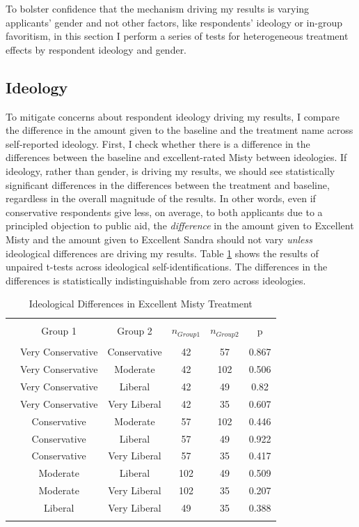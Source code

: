 \documentclass[12pt]{article}%
\begin{document}
\begin{doublespace}
To bolster confidence that the mechanism driving my results is varying applicants' gender and not other factors, like respondents' ideology or in-group favoritism, in this section I perform a series of tests for heterogeneous treatment effects by respondent ideology and gender.

\subsection*{Ideology}
To mitigate concerns about respondent ideology driving my results, I compare the difference in the amount given to the baseline and the treatment name across self-reported ideology. First, I check whether there is a difference in the differences between the baseline and excellent-rated Misty between ideologies. If ideology, rather than gender, is driving my results, we should see statistically significant differences in the differences between the treatment and baseline, regardless in the overall magnitude of the results. In other words, even if conservative respondents give less, on average, to both applicants due to a principled objection to public aid, the \textit{difference} in the amount given to Excellent Misty and the amount given to Excellent Sandra should not vary \textit{unless} ideological differences are driving my results. Table \ref{ideo-mist} shows the results of unpaired t-tests across ideological self-identifications. The differences in the differences is statistically indistinguishable from zero across ideologies.

\begin{table}[!htbp] \centering 
	\caption{Ideological Differences in Excellent Misty Treatment} 
	\label{ideo-mist} 
	\begin{tabular}{@{\extracolsep{5pt}} cccccc} 
		\\[-1.8ex]\hline 
		\hline \\[-1.8ex] 
		& Group 1 & Group 2 & $n_{Group 1}$ & $n_{Group 2}$ & p \\ 
		\hline \\[-1.8ex] 
		& Very Conservative & Conservative & 42 & 57 & 0.867 \\ 
		 & Very Conservative & Moderate & 42 & 102 & 0.506 \\ 
		 & Very Conservative & Liberal & 42 & 49 & 0.82 \\ 
		 & Very Conservative & Very Liberal & 42 & 35 & 0.607 \\ 
		 & Conservative & Moderate & 57 & 102 & 0.446 \\ 
		 & Conservative & Liberal & 57 & 49 & 0.922 \\ 
		 & Conservative & Very Liberal & 57 & 35 & 0.417 \\ 
		 & Moderate & Liberal & 102 & 49 & 0.509 \\ 
		 & Moderate & Very Liberal & 102 & 35 & 0.207 \\ 
		 & Liberal & Very Liberal & 49 & 35 & 0.388 \\ 
		\hline \\[-1.8ex] 
	\end{tabular} 
\end{table} 


\end{doublespace}
\end{document}
